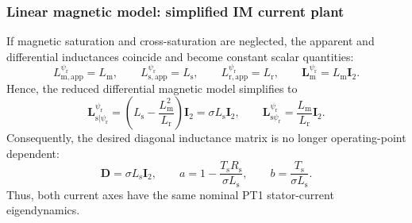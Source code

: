 \begin{frame}
    \frametitle{Linear magnetic model: simplified IM current plant}
    If magnetic saturation and cross-saturation are neglected, the apparent and differential inductances coincide and become constant scalar quantities:
    \begin{equation}
        L^{\psi_\mathrm{r}}_{\mathrm{m},\mathrm{app}}=L_\mathrm{m},\qquad
        L^{\psi_\mathrm{r}}_{\mathrm{s},\mathrm{app}}=L_\mathrm{s},\qquad
        L^{\psi_\mathrm{r}}_{\mathrm{r},\mathrm{app}}=L_\mathrm{r},
        \qquad
        \bm{L}^{\psi_\mathrm{r}}_\mathrm{m}=L_\mathrm{m}\bm{I}_2.
    \end{equation}\pause%
    Hence, the reduced differential magnetic model simplifies to
    \begin{equation}
        \bm{L}^{\psi_\mathrm{r}}_{\mathrm{s}|\psi_\mathrm{r}}
        =\left(L_\mathrm{s}-\frac{L_\mathrm{m}^2}{L_\mathrm{r}}\right)\bm{I}_2
        =\sigma L_\mathrm{s}\bm{I}_2,
        \qquad
        \bm{L}^{\psi_\mathrm{r}}_{\mathrm{s}\psi_\mathrm{r}}
        =\frac{L_\mathrm{m}}{L_\mathrm{r}}\bm{I}_2 .
        \label{eq:IM_linear_Ls_psir}
    \end{equation}\pause%
    Consequently, the desired diagonal inductance matrix is no longer operating-point dependent:
    \begin{equation}
        \bm{D}=\sigma L_\mathrm{s}\bm{I}_2,
        \qquad
        a=1-\frac{T_\mathrm{s}R_\mathrm{s}}{\sigma L_\mathrm{s}},
        \qquad
        b=\frac{T_\mathrm{s}}{\sigma L_\mathrm{s}}.
    \end{equation}
    Thus, both current axes have the same nominal PT1 stator-current eigendynamics.
\end{frame}


